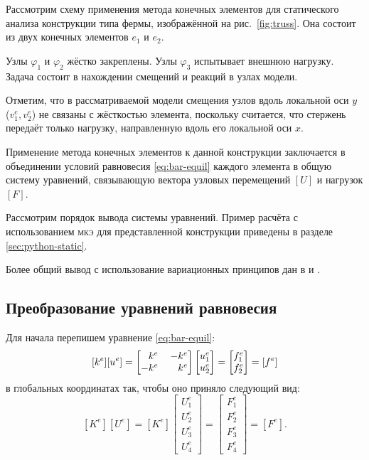 \documentclass[10pt]{article}
\numberwithin{equation}{section}
\renewcommand{\phi}{\varphi}
\newcommand{\fem}{\textsc{мкэ}}
\newcommand{\matr}[1]{[#1]}
\newcommand{\figref}[1]{рис. \ref{#1}}
\newcommand{\node}[1]{$\phi_{#1}$}
\newcommand{\element}[1]{$e_{#1}$}
\newcommand{\mm}{\llap{$-$}}
\newcommand{\phm}{\phantom{-}}
\begin{document}
Рассмотрим схему применения метода конечных элементов для статического
анализа конструкции типа фермы, изображённой на \figref{fig:truss}.
Она состоит из двух конечных элементов \element{1} и \element{2}.



Узлы \node{1} и \node{2} жёстко закреплены. Узлы \node{3} испытывает
внешнюю нагрузку. Задача состоит в нахождении смещений и реакций в
узлах модели.

Отметим, что в рассматриваемой модели смещения узлов вдоль локальной
оси $y$ ($v_1^e, v_2^e$) не связаны с жёсткостью элемента, поскольку
считается, что стержень передаёт только нагрузку, направленную вдоль
его локальной оси $x$.

Применение метода конечных элементов к данной конструкции заключается
в объединении условий равновесия \eqref{eq:bar-equil} каждого элемента
в общую систему уравнений, связывающую вектора узловых перемещений
$\matr{U}$ и нагрузок $\matr{F}$.

Рассмотрим порядок вывода системы уравнений. Пример расчёта с
использованием \fem{} для представленной конструкции приведены в
разделе \ref{sec:python-static}.

Более общий вывод с использование вариационных принципов дан в
\cite{bathe96} и \cite{zienkiewicz00}.

\subsection{Преобразование уравнений равновесия}

Для начала перепишем уравнение \eqref{eq:bar-equil}:
\begin{equation}
  \label{eq:bar-element-equil}
  \matr{k^e}\matr{u^e}=
  \begin{bmatrix}
    \phm{}k^e&& \mm k^e\\
    -k^e && k^e    
  \end{bmatrix}
  \begin{bmatrix}
    u_1^e\\
    u_2^e
  \end{bmatrix}
  =
  \begin{bmatrix}
    f_1^e\\
    f_2^e
  \end{bmatrix}=\matr{f^e}
\end{equation}
в глобальных координатах так, чтобы оно приняло следующий вид:
\begin{equation}
  \label{eq:target-equil}
  \matr{K^e}\matr{U^e}=\matr{K^e}
  \begin{bmatrix}
    U_1^e\\
    U_2^e\\
    U_3^e\\
    U_4^e
  \end{bmatrix}
  =
  \begin{bmatrix}
    F_1^e\\
    F_2^e\\
    F_3^e\\
    F_4^e
  \end{bmatrix}=\matr{F^e}.
\end{equation}
\end{document}
